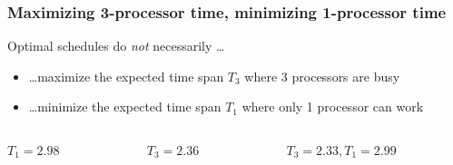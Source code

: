 \documentclass{beamer}
\begin{document}
\begin{frame}
  \frametitle{Maximizing 3-processor time, minimizing 1-processor
    time}
  \begin{block}{Optimal schedules do \emph{not} necessarily \dots}
    \begin{itemize}
    \item \dots maximize the expected time span $T_3$ where 3 processors are busy
    \item \dots minimize the expected time span $T_1$ where only 1 processor can work
    \end{itemize}
  \end{block}
  \begin{columns}
    \begin{column}{.3\textwidth}
      \begin{center}
        
        $T_1=2.98$
      \end{center}
    \end{column}
    \begin{column}{.3\textwidth}
      \begin{center}
         
        $T_3=2.36$
      \end{center}
    \end{column}
    \begin{column}{.4\textwidth}
      \begin{center}
         
        $T_3=2.33, T_1=2.99$
      \end{center}
    \end{column}
  \end{columns}
\end{frame}
\end{document}
